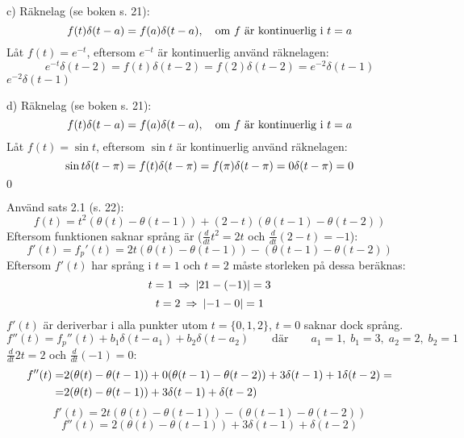 \begin{task}{c)}
	Räknelag (se boken s. 21):
	\[f(t)\delta(t-a)=f(a)\delta(t-a), \quad \text{om } f \text{ är kontinuerlig i }t=a\]
	Låt $f(t)=e^{-t}$, eftersom $e^{-t}$ är kontinuerlig använd räknelagen:
	\[e^{-t}\delta(t-2)=
	f(t)\delta(t-2)=
	f(2)\delta(t-2)=
	e^{-2}\delta(t-1)\]
	\ans $e^{-2}\delta(t-1)$
\end{task}

\begin{task}{d)}
	Räknelag (se boken s. 21):
	\[f(t)\delta(t-a)=f(a)\delta(t-a), \quad \text{om } f \text{ är kontinuerlig i }t=a\]
	Låt $f(t)=\sin t$, eftersom $\sin t$ är kontinuerlig använd räknelagen:
	\[\sin t\delta(t-\pi)=
	f(t)\delta(t-\pi)=
	f(\pi)\delta(t-\pi)=
	0\*\delta(t-\pi)=
	0\]
	\ans $0$
\end{task}

\begin{task}{2.9}
	Använd sats 2.1 (s. 22):
	\[f(t)= t^2(\theta(t)-\theta(t-1))+(2-t)(\theta(t-1)-\theta(t-2))\]
	Eftersom funktionen saknar språng är ($\frac{d}{dt}t^2=2t$ och $\frac{d}{dt}(2-t)=-1$):
	\[f'(t)=f_p'(t)=2t(\theta(t)-\theta(t-1))-(\theta(t-1)-\theta(t-2))\]
	Eftersom $f'(t)$ har språng i $t=1$ och $t=2$ måste storleken på dessa beräknas:
	\[t=1 \ra \abs{2\*1-(-1)}=3\]
	\[t=2 \ra \abs{-1-0}=1\]
	$f'(t)$ är deriverbar i alla punkter utom $t=\{0,1,2\}$, $t=0$ saknar dock språng.
	\[f''(t)=f_p''(t)+b_1\delta(t-a_1)+b_2\delta(t-a_2) \qquad\text{där}\qquad a_1=1,\;b_1=3,\;a_2=2,\;b_2=1\]
	$\frac{d}{dt}2t=2$ och $\frac{d}{dt}(-1)=0$:
	\begin{align*}
	f''(t)=
	&2(\theta(t)-\theta(t-1))+0\*(\theta(t-1)-\theta(t-2))+3\delta(t-1)+1\*\delta(t-2)= \\ =
	&2(\theta(t)-\theta(t-1))+3\delta(t-1)+\delta(t-2)
	\end{align*}
	\ans 
	\[f'(t)=2t(\theta(t)-\theta(t-1))-(\theta(t-1)-\theta(t-2))\]
	\[f''(t)=2(\theta(t)-\theta(t-1))+3\delta(t-1)+\delta(t-2)\]
\end{task}